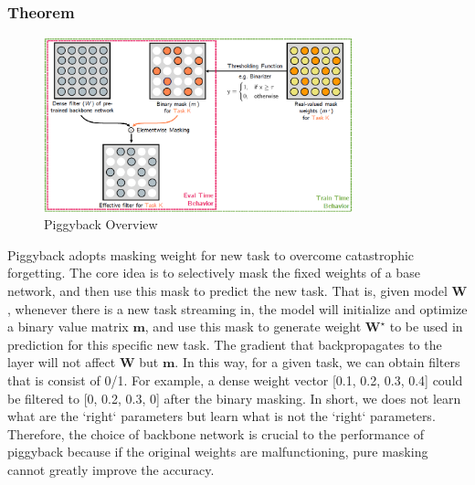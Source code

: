\subsubsection{Theorem}
\begin{figure}[h]
  \centering
  \includegraphics[width=0.8\textwidth]{figure/piggyback.png}
  \caption{Piggyback Overview}
  \label{piggy}
\end{figure}

Piggyback adopts masking weight for new task to overcome catastrophic forgetting. The core idea is to selectively mask the fixed weights of a base network, and then use this mask to predict the new task. That is, given model $\mathbf{W}$, whenever there is a new task streaming in, the model will initialize and optimize a binary value matrix $\mathbf{m}$, and use this mask to generate weight $\mathbf{W^\star}$ to be used in prediction for this specific new task. The gradient that backpropagates to the layer will not affect $\mathbf{W}$ but $\mathbf{m}$. In this way, for a given task, we can obtain filters that is consist of 0/1. For example, a dense weight vector [0.1, 0.2, 0.3, 0.4] could be filtered to [0, 0.2, 0.3, 0] after the binary masking. In short, we does not learn what are the `right` parameters but learn what is not the `right` parameters. Therefore, the choice of backbone network is crucial to the performance of piggyback because if the original weights are malfunctioning, pure masking cannot greatly improve the accuracy.

